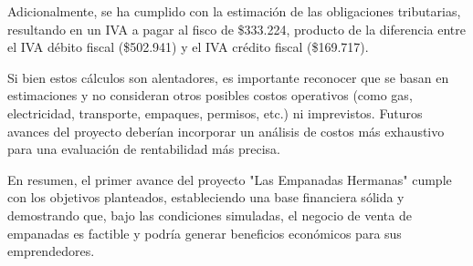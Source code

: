 \documentclass[12pt]{article}
\begin{document}
Adicionalmente, se ha cumplido con la estimación de las obligaciones tributarias, resultando en un IVA a pagar al fisco de \$333.224, producto de la diferencia entre el IVA débito fiscal (\$502.941) y el IVA crédito fiscal (\$169.717).

Si bien estos cálculos son alentadores, es importante reconocer que se basan en estimaciones y no consideran otros posibles costos operativos (como gas, electricidad, transporte, empaques, permisos, etc.) ni imprevistos. Futuros avances del proyecto deberían incorporar un análisis de costos más exhaustivo para una evaluación de rentabilidad más precisa.

En resumen, el primer avance del proyecto "Las Empanadas Hermanas" cumple con los objetivos planteados, estableciendo una base financiera sólida y demostrando que, bajo las condiciones simuladas, el negocio de venta de empanadas es factible y podría generar beneficios económicos para sus emprendedores.
\end{document}
